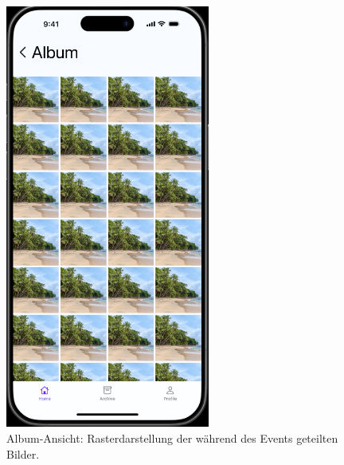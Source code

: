 \documentclass[11pt,a4paper]{article}
\begin{document}
\begin{figure}[h]
  \centering
  \includegraphics[width=0.6\textwidth]{image-8.png}
  \caption{Album‑Ansicht: Rasterdarstellung der während des Events geteilten Bilder.}
  \label{fig:album}
\end{figure}
\end{document}
